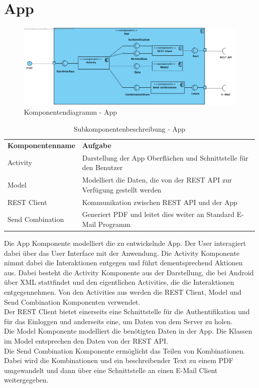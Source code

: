\section{App}
\begin{figure}[h]
	\centering
	\includegraphics[width=\textwidth]{komponentendiagramm/App}
	\caption{Komponentendiagramm - App}
	\label{fig:komponentendiagramm-app}
\end{figure}

\begin{table}[h]
	\centering
	\begin{tabularx}{\textwidth}{X X}
		\rowcolor[HTML]{C0C0C0}
		\textbf{Komponentenname} & \textbf{Aufgabe} \\
		Activity & Darstellung der App Oberflächen und Schnittstelle für den Benutzer\\
    \rowcolor[HTML]{E7E7E7}
		 Model & Modelliert die Daten, die von der REST API zur Verfügung gestellt werden\\
		 REST Client & Kommunikation zwischen REST API und der App\\
    \rowcolor[HTML]{E7E7E7}
		Send Combination & Generiert PDF und leitet dies weiter an Standard E-Mail Programm
	\end{tabularx}
	\caption{Subkomponentenbeschreibung - App}
	\label{table:Subkomponentenbeschreibung - app}
\end{table}

Die App Komponente modelliert die zu entwickelnde App.
Der User interagiert dabei über das User Interface mit der Anwendung.
Die Activity Komponente nimmt dabei die Interaktionen entgegen und führt dementsprechend Aktionen aus.
Dabei besteht die Activity Komponente aus der Darstellung, die bei Android über XML stattfindet und den eigentlichen Activities, die die Interaktionen entgegennehmen.
Von den Activities aus werden die REST Client, Model und Send Combination Komponenten verwendet.
\\
Der REST Client bietet einerseits eine Schnittstelle für die Authentifikation und für das Einloggen und anderseits eine, um Daten von dem Server zu holen.
\\
Die Model Komponente modelliert die benötigten Daten in der App.
Die Klassen im Model entsprechen den Daten von der REST API.
\\
Die Send Combination Komponente ermöglicht das Teilen von Kombinationen.
Dabei wird die Kombinationen und ein beschreibender Text zu einem PDF umgewandelt und dann über eine Schnittstelle an einen E-Mail Client weitergegeben.
